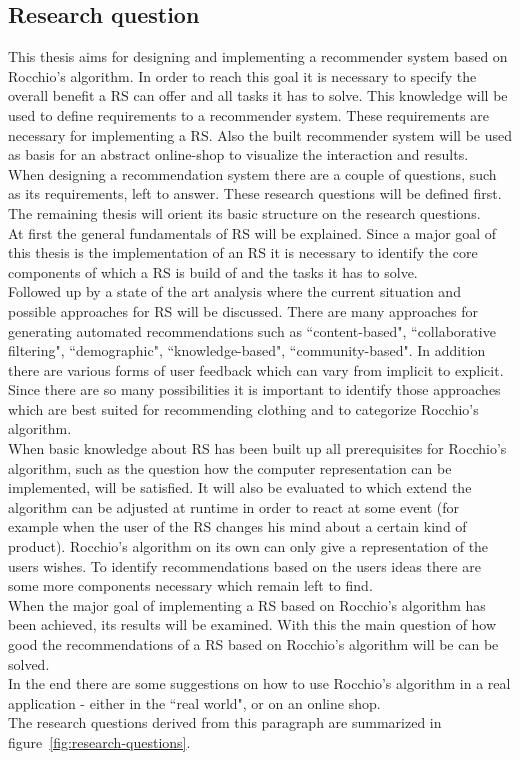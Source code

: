 \subsection{Research question}
This thesis aims for designing and implementing a recommender system based on Rocchio's algorithm.
In order to reach this goal it is necessary to specify the overall benefit a RS can offer and all tasks it has to solve.
This knowledge will be used to define requirements to a recommender system.
These requirements are necessary for implementing a RS.
Also the built recommender system will be used as basis for an abstract online-shop to visualize the interaction and results.
\\
When designing a recommendation system there are a couple of questions, such as its requirements, left to answer.
These research questions will be defined first.
The remaining thesis will orient its basic structure on the research questions.
\\
At first the general fundamentals of RS will be explained.
Since a major goal of this thesis is the implementation of an RS it is necessary to identify the core components of which a RS is build of and the tasks it has to solve.
\\
Followed up by a state of the art analysis where the current situation and possible approaches for RS will be discussed.
There are many approaches for generating automated recommendations such as ``content-based", ``collaborative filtering", ``demographic", ``knowledge-based", ``community-based".\citep[p.~10-12]{ricci:2011}
In addition there are various forms of user feedback which can vary from implicit to explicit.\citep[p.~76]{lops:2011}
Since there are so many possibilities it is important to identify those approaches which are best suited for recommending clothing and to categorize Rocchio's algorithm.
\\
When basic knowledge about RS has been built up all prerequisites for Rocchio's algorithm, such as the question how the computer representation can be implemented, will be satisfied.
It will also be evaluated to which extend the algorithm can be adjusted at runtime in order to react at some event (for example when the user of the RS changes his mind about a certain kind of product).
Rocchio's algorithm on its own can only give a representation of the users wishes.
To identify recommendations based on the users ideas there are some more components necessary which remain left to find.
\\
When the major goal of implementing a RS based on Rocchio's algorithm has been achieved, its results will be examined.
With this the main question of how good the recommendations of a RS based on Rocchio's algorithm will be can be solved.
\\
In the end there are some suggestions on how to use Rocchio's algorithm in a real application - either in the ``real world", or on an online shop.
\\
The research questions derived from this paragraph are summarized in figure~\ref{fig:research-questions}.



